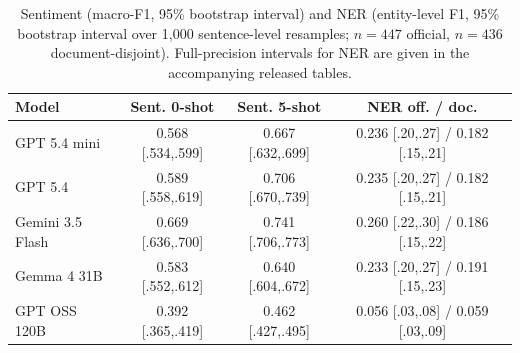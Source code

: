\documentclass[pdflatex,sn-mathphys-ay]{sn-jnl}
\begin{document}
\begin{table}[t]
\centering
\small
{}
\caption{Multiple choice accuracy, 95\% Wilson interval, n as given per column. \texttt{mcq4} subset throughout.}
\label{tab:mcq-main}
\end{table}

\begin{table}[t]
\centering
\small
\begin{tabular}{lccc}
\toprule
\textbf{Model} & \textbf{Sent. 0-shot} & \textbf{Sent. 5-shot} & \textbf{NER off. / doc.} \\
\midrule
GPT 5.4 mini & 0.568 [.534,.599] & 0.667 [.632,.699] & 0.236 [.20,.27] / 0.182 [.15,.21] \\
GPT 5.4 & 0.589 [.558,.619] & 0.706 [.670,.739] & 0.235 [.20,.27] / 0.182 [.15,.21] \\
Gemini 3.5 Flash & 0.669 [.636,.700] & 0.741 [.706,.773] & 0.260 [.22,.30] / 0.186 [.15,.22] \\
Gemma 4 31B & 0.583 [.552,.612] & 0.640 [.604,.672] & 0.233 [.20,.27] / 0.191 [.15,.23] \\
GPT OSS 120B & 0.392 [.365,.419] & 0.462 [.427,.495] & 0.056 [.03,.08] / 0.059 [.03,.09] \\
\bottomrule
\end{tabular}
\caption{Sentiment (macro-F1, 95\% bootstrap interval) and NER (entity-level F1, 95\% bootstrap interval over 1,000 sentence-level resamples; $n{=}447$ official, $n{=}436$ document-disjoint). Full-precision intervals for NER are given in the accompanying released tables.}
\label{tab:sent-ner-main}
\end{table}
\end{document}
